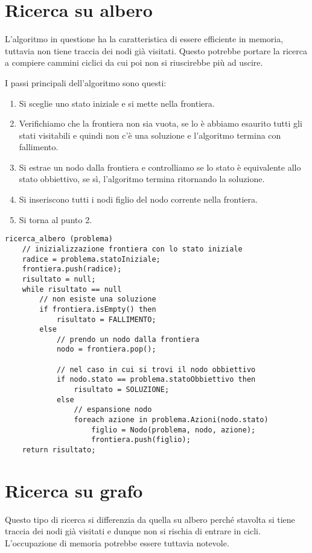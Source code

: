 \section{Ricerca su albero}
L'algoritmo in questione ha la caratteristica di essere efficiente in memoria, tuttavia
non tiene traccia dei nodi gi\`a visitati. Questo potrebbe portare la ricerca a compiere
cammini ciclici da cui poi non si riuscirebbe pi\`u ad uscire.

I passi principali dell'algoritmo sono questi:
\begin{enumerate}
	\item Si sceglie uno stato iniziale e si mette nella frontiera.
	\item Verifichiamo che la frontiera non sia vuota, se lo \`e abbiamo esaurito tutti gli
	      stati visitabili e quindi non c'\`e una soluzione e l'algoritmo termina con
	      fallimento.
	\item Si estrae un nodo dalla frontiera e controlliamo se lo stato \`e equivalente allo
	      stato obbiettivo, se s\`i, l'algoritmo termina ritornando la soluzione.
	\item Si inseriscono tutti i nodi figlio del nodo corrente nella frontiera.
	\item Si torna al punto 2.
\end{enumerate}
\begin{lstlisting}[style=pseudo-style]
ricerca_albero (problema)
	// inizializzazione frontiera con lo stato iniziale
	radice = problema.statoIniziale;
	frontiera.push(radice);
	risultato = null;
	while risultato == null
		// non esiste una soluzione
		if frontiera.isEmpty() then
			risultato = FALLIMENTO;
		else
			// prendo un nodo dalla frontiera
			nodo = frontiera.pop();
		
			// nel caso in cui si trovi il nodo obbiettivo
			if nodo.stato == problema.statoObbiettivo then
				risultato = SOLUZIONE;
			else
				// espansione nodo
				foreach azione in problema.Azioni(nodo.stato)
					figlio = Nodo(problema, nodo, azione);
					frontiera.push(figlio);
	return risultato;
\end{lstlisting}

\section{Ricerca su grafo}
Questo tipo di ricerca si differenzia da quella su albero perch\'e stavolta si tiene traccia
dei nodi gi\`a visitati e dunque non si rischia di entrare in cicli. L'occupazione di memoria
potrebbe essere tuttavia notevole.

